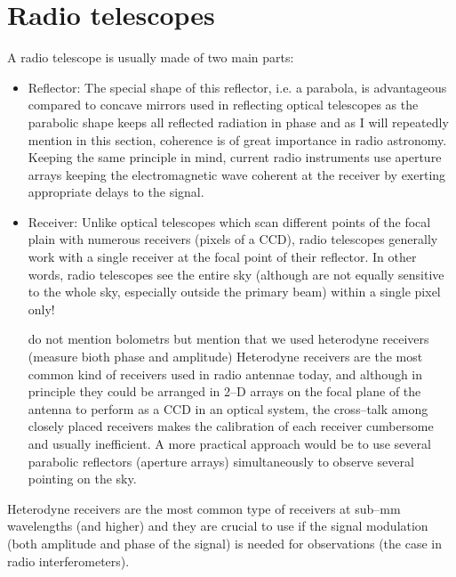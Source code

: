 \documentclass[a4wide,12pt]{book}
\newcommand{\ignore}[1]{}
\begin{document}
{\section{Radio telescopes}
A radio telescope is usually made of two main parts:
\begin{itemize}
\item Reflector: The special shape of this reflector, i.e. a parabola, is advantageous compared to concave mirrors used in reflecting optical telescopes as the parabolic shape keeps all reflected radiation  in phase and as I will repeatedly mention in this section, coherence is of great importance in radio astronomy. Keeping the same principle in mind, current radio instruments use aperture arrays keeping the electromagnetic wave coherent at the receiver by exerting appropriate delays to the signal.
\item Receiver: Unlike optical telescopes which scan different points of the focal plain with numerous receivers (pixels of a CCD), radio telescopes generally work with a single receiver at the focal point of their reflector. In other words, radio telescopes see the entire sky (although are not equally sensitive to the whole sky, especially outside the primary beam)\ignore{{\bf primary beam but look it up in the white book!}} within a single pixel only!

do not mention bolometrs but mention that we used heterodyne receivers (measure bioth phase and amplitude)
Heterodyne receivers are the most common kind of receivers used in radio antennae today, and although in principle they could be arranged in 2--D arrays on the focal plane of the antenna to perform as a CCD in an optical system, the cross--talk among closely placed receivers makes the calibration of each receiver cumbersome and usually inefficient. A more practical approach would be to use several parabolic reflectors (aperture arrays) simultaneously to observe several pointing on the sky.

\end{itemize}
Heterodyne receivers are the most common type of receivers at sub--mm wavelengths (and higher) and they are crucial to use if the signal modulation (both amplitude and phase of the signal) is needed for observations (the case in radio interferometers).\\

}
\end{document}
